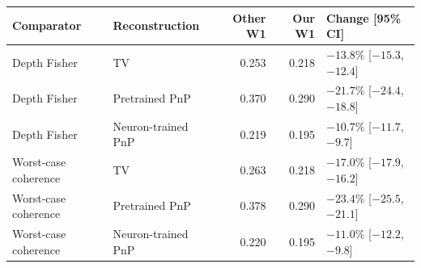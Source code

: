 \begin{tabular}{llrrl}
\toprule
Comparator & Reconstruction & Other W1 & Our W1 & Change [95\% CI] \\
\midrule
Depth Fisher & TV & 0.253 & 0.218 & $-13.8\%$ [$-15.3$, $-12.4$] \\
Depth Fisher & Pretrained PnP & 0.370 & 0.290 & $-21.7\%$ [$-24.4$, $-18.8$] \\
Depth Fisher & Neuron-trained PnP & 0.219 & 0.195 & $-10.7\%$ [$-11.7$, $-9.7$] \\
Worst-case coherence & TV & 0.263 & 0.218 & $-17.0\%$ [$-17.9$, $-16.2$] \\
Worst-case coherence & Pretrained PnP & 0.378 & 0.290 & $-23.4\%$ [$-25.5$, $-21.1$] \\
Worst-case coherence & Neuron-trained PnP & 0.220 & 0.195 & $-11.0\%$ [$-12.2$, $-9.8$] \\
\bottomrule
\end{tabular}
